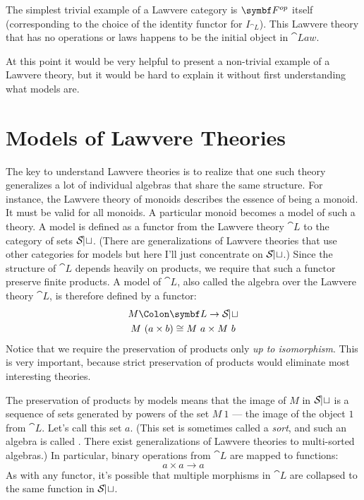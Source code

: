 The simplest trivial example of a Lawvere category is
$\Fop$ itself (corresponding to the choice of
the identity functor for $I_{\cat{L}}$). This Lawvere theory that has no
operations or laws happens to be the initial object in $\cat{Law}$.

At this point it would be very helpful to present a non-trivial example
of a Lawvere theory, but it would be hard to explain it without first
understanding what models are.

\section{Models of Lawvere Theories}

The key to understand Lawvere theories is to realize that one such
theory generalizes a lot of individual algebras that share the same
structure. For instance, the Lawvere theory of monoids describes the
essence of being a monoid. It must be valid for all monoids. A
particular monoid becomes a model of such a theory. A model is defined
as a functor from the Lawvere theory $\cat{L}$ to the category of sets
$\mathcal{S\mkern-3mu et}$. (There are generalizations of Lawvere theories that use
other categories for models but here I'll just concentrate on
$\mathcal{S\mkern-3mu et}$.) Since the structure of $\cat{L}$ depends heavily on
products, we require that such a functor preserve finite products. A
model of $\cat{L}$, also called the algebra over the Lawvere theory
$\cat{L}$, is therefore defined by a functor:
\begin{gather*}
M \Colon \cat{L} \to \Set \\
M\ (a \times b) \cong M\ a \times M\ b
\end{gather*}
Notice that we require the preservation of products only \emph{up to
isomorphism}. This is very important, because strict preservation of
products would eliminate most interesting theories.

The preservation of products by models means that the image of
$M$ in $\mathcal{S\mkern-3mu et}$ is a sequence of sets generated by powers of
the set $M\ 1$ --- the image of the object $1$ from
$\cat{L}$. Let's call this set $a$. (This set is sometimes
called a \emph{sort}, and such an algebra is called . There
exist generalizations of Lawvere theories to multi-sorted algebras.) In
particular, binary operations from $\cat{L}$ are mapped to functions:
\[a \times a \to a\]
As with any functor, it's possible that multiple morphisms in $\cat{L}$
are collapsed to the same function in $\mathcal{S\mkern-3mu et}$.

